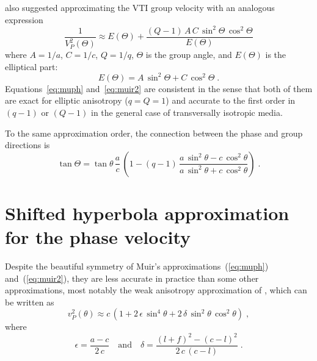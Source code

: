 \cite{Muir.sep.44.55} also suggested approximating the VTI
group velocity with an analogous expression
\begin{equation}
  \label{eq:muir2}
\frac{1}{V^2_{P}(\Theta)} \approx E(\Theta) + 
\frac{(Q-1)\,A\,C\,
\sin^2{\Theta}\,\cos^2{\Theta}}{E(\Theta)}
\end{equation}
where $A=1/a$, $C=1/c$, $Q = 1/q$, $\Theta$ is the group angle, and
$E(\Theta)$ is the elliptical part:
\begin{equation}
\label{eq:muel2}
E(\Theta) = A\,\sin^2{\Theta} + C\,\cos^2{\Theta}\;.
\end{equation}
Equations~\eqref{eq:muph} and~\eqref{eq:muir2} are consistent in the sense
that both of them are exact for elliptic anisotropy ($q=Q=1$) and
accurate to the first order in $(q-1)$ or $(Q-1)$ in the general case of
transversally isotropic media.

To the same approximation order, the connection between the phase and group
directions is
\begin{equation}
\label{eq:t2T}
\tan{\Theta}  = \tan{\theta}\,\frac{a}{c}\, 
\left(1 - (q-1)\,\frac
  {a\,\sin^2{\theta} - c\,\cos^2{\theta}}
  {a\,\sin^2{\theta} + c\,\cos^2{\theta}}\right)\;.
\end{equation}

\section{Shifted hyperbola approximation for the phase velocity}

Despite the beautiful symmetry of Muir's approximations~(\ref{eq:muph})
and~(\ref{eq:muir2}), they are less accurate in practice than some other
approximations, most notably the weak anisotropy approximation of
\cite{GEO51-10-19541966}, which can be written as 
\cite[]{GEO61-02-04670483}
\begin{equation}
  \label{eq:thoms}
  v_P^2(\theta) \approx c\,\left(1 + 2\,\epsilon\,\sin^4{\theta} + 
  2\,\delta\,\sin^2{\theta}\,\cos^2{\theta}\right)\;,
\end{equation}
where 
\begin{equation}
  \label{eq:epsdelta}
  \epsilon = \frac{a-c}{2\,c}\quad\mbox{and}\quad
  \delta = \frac{(l + f)^2 - (c - l)^2}{2\,c\,(c - l)}\;.
\end{equation}

